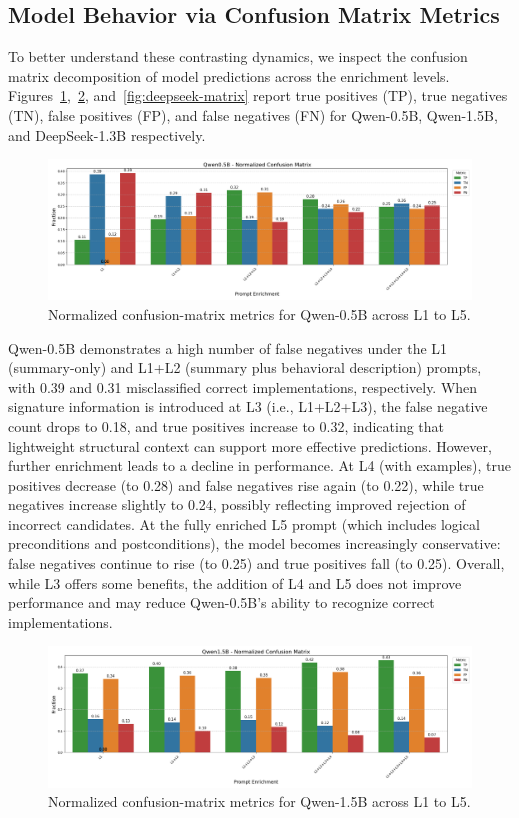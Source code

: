 \documentclass[a4paper]{usiinfbachelorproject}
\begin{document}
\subsection{Model Behavior via Confusion Matrix Metrics}
To better understand these contrasting dynamics, we inspect the confusion matrix decomposition of model predictions across the enrichment levels. Figures~\ref{fig:qwen05-matrix},~\ref{fig:qwen15-matrix}, and~\ref{fig:deepseek-matrix} report true positives (TP), true negatives (TN), false positives (FP), and false negatives (FN) for Qwen-0.5B, Qwen-1.5B, and DeepSeek-1.3B respectively.
\begin{figure}[H]\centering
  \includegraphics[width=\linewidth]{figures/Qwen0.5B_matrix.png}
  \caption{Normalized confusion-matrix metrics for Qwen-0.5B across L1 to L5.}
  \label{fig:qwen05-matrix}
\end{figure}
\noindent
Qwen-0.5B demonstrates a high number of false negatives under the L1 (summary-only) and L1+L2 (summary plus behavioral description) prompts, with 0.39 and 0.31 misclassified correct implementations, respectively. When signature information is introduced at L3 (i.e., L1+L2+L3), the false negative count drops to 0.18, and true positives increase to 0.32, indicating that lightweight structural context can support more effective predictions. However, further enrichment leads to a decline in performance. At L4 (with examples), true positives decrease (to 0.28) and false negatives rise again (to 0.22), while true negatives increase slightly to 0.24, possibly reflecting improved rejection of incorrect candidates. At the fully enriched L5 prompt (which includes logical preconditions and postconditions), the model becomes increasingly conservative: false negatives continue to rise (to 0.25) and true positives fall (to 0.25). Overall, while L3 offers some benefits, the addition of L4 and L5 does not improve performance and may reduce Qwen-0.5B’s ability to recognize correct implementations.
\begin{figure}[H]\centering
  \includegraphics[width=\linewidth]{figures/Qwen1.5B_matrix.png}
  \caption{Normalized confusion-matrix metrics for Qwen-1.5B across L1 to L5.}
  \label{fig:qwen15-matrix}
\end{figure}
\end{document}
